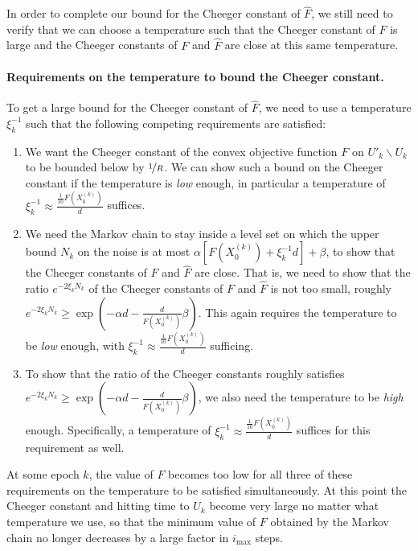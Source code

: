 \documentclass[final,12pt]{colt2018} %
\begin{document}
{In order to complete our bound for the Cheeger constant of $\hat{F}$, we still need to verify that we can choose a temperature such that the Cheeger constant of $F$ is large and the Cheeger constants of $F$ and $\hat{F}$ are close at this same temperature.
% 



\paragraph{Requirements on the temperature to bound the Cheeger constant.}
To get a large bound for the Cheeger constant of $\hat{F}$, we  need to use a temperature $\xi_k^{-1}$ such that the following competing requirements are satisfied:
\begin{enumerate}
\item   We want the Cheeger constant of the convex objective function $F$ on $U'_k\backslash U_k$ to be bounded below by $\nicefrac{1}{R}$.  We can show such a bound on the Cheeger constant if the temperature is {\em low} enough, in particular a temperature of $\xi_k^{-1} \approx \frac{\frac{1}{10}F(X^{(k)}_0)}{d}$ suffices.
\item We need the Markov chain to stay inside a level set on which the upper bound $N_k$ on the noise is at most $\alpha[F(X^{(k)}_0) + \xi_k^{-1}d]+\beta$, to show that the Cheeger constants of $F$ and $\hat{F}$ are close.  That is, we need to show that the ratio $e^{-2\xi_k N_k}$ of the Cheeger constants of $F$ and $\hat{F}$ is not too small, roughly $e^{-2\xi_k N_k} \geq \exp\left(-\alpha d - \frac{d}{F(X^{(k)}_0)}\beta\right)$.  This again requires the temperature to be {\em low} enough, with $\xi_k^{-1} \approx \frac{\frac{1}{10}F(X^{(k)}_0)}{d}$ sufficing.
\item To show that the ratio of the Cheeger constants roughly satisfies $e^{-2\xi_k N_k} \geq \exp\left(-\alpha d - \frac{d}{F(X^{(k)}_0)}\beta\right)$, we also need the temperature to be {\em high} enough.  Specifically, a temperature of $\xi_k^{-1} \approx \frac{\frac{1}{10}F(X^{(k)}_0)}{d}$ suffices for this requirement as well.
\end{enumerate}
At some epoch $k$, the value of $F$ becomes too low for all three of these requirements on the temperature to be satisfied simultaneously.  At this point the Cheeger constant and hitting time to $U_k$ become very large no matter what temperature we use, so that the minimum value of $F$ obtained by the Markov chain no longer decreases by a large factor in $i_{\mathrm{max}}$ steps.

}
\end{document}

